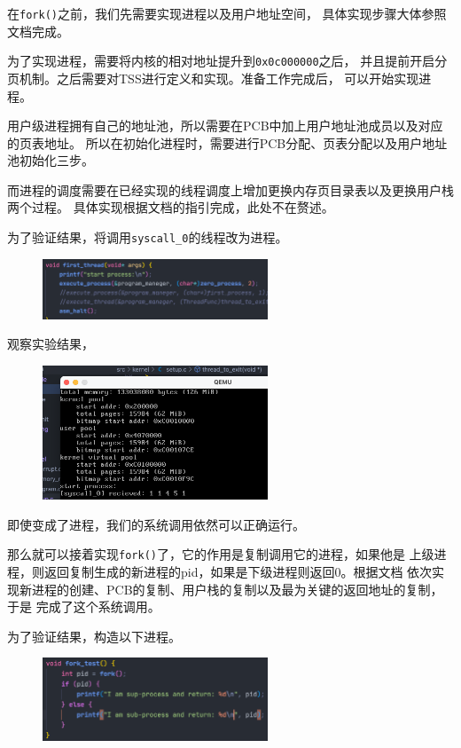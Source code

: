 在\texttt{fork()}之前，我们先需要实现进程以及用户地址空间，
具体实现步骤大体参照文档完成。

为了实现进程，需要将内核的相对地址提升到\texttt{0x0c000000}之后，
并且提前开启分页机制。之后需要对TSS进行定义和实现。准备工作完成后，
可以开始实现进程。

用户级进程拥有自己的地址池，所以需要在PCB中加上用户地址池成员以及对应的页表地址。
所以在初始化进程时，需要进行PCB分配、页表分配以及用户地址池初始化三步。

而进程的调度需要在已经实现的线程调度上增加更换内存页目录表以及更换用户栈两个过程。
具体实现根据文档的指引完成，此处不在赘述。

为了验证结果，将调用\texttt{syscall\_0}的线程改为进程。

\begin{figure}[H]
    \centering
    \includegraphics[width=0.6\textwidth]{figures/process.png}
    \label{process}
\end{figure}

观察实验结果，

\begin{figure}[H]
    \centering
    \includegraphics[width=0.6\textwidth]{figures/zeroRes.png}
    \label{zeroRes1}
\end{figure}

即使变成了进程，我们的系统调用依然可以正确运行。

那么就可以接着实现\texttt{fork()}了，它的作用是复制调用它的进程，如果他是
上级进程，则返回复制生成的新进程的pid，如果是下级进程则返回0。根据文档
依次实现新进程的创建、PCB的复制、用户栈的复制以及最为关键的返回地址的复制，于是
完成了这个系统调用。

为了验证结果，构造以下进程。

\begin{figure}[H]
    \centering
    \includegraphics[width=0.6\textwidth]{figures/forkTest.png}
    \label{forkTest}
\end{figure}

